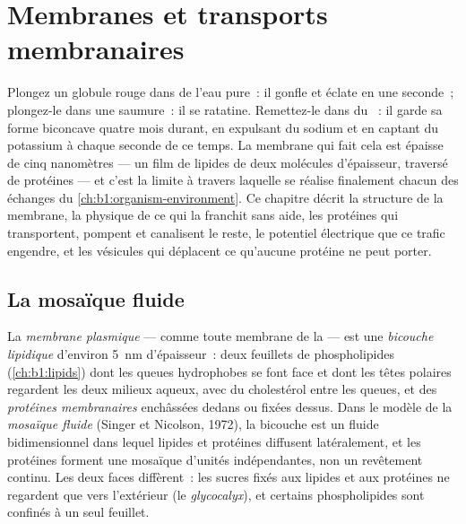 \chapter{Membranes et transports membranaires}\label{ch:b1:membranes-transport}

Plongez un globule rouge dans de l'eau pure~: il gonfle et éclate en une
seconde~; plongez-le dans une saumure~: il se ratatine. Remettez-le dans
du ~: il garde sa forme biconcave quatre mois durant, en expulsant
du sodium et en captant du potassium à chaque seconde de ce temps. La
membrane qui fait cela est épaisse de cinq nanomètres --- un film de
lipides de deux molécules d'épaisseur, traversé de protéines --- et
c'est la limite à travers laquelle se réalise finalement chacun des
échanges du \cref{ch:b1:organism-environment}. Ce chapitre décrit la
structure de la membrane, la physique de ce qui la franchit sans aide,
les protéines qui transportent, pompent et canalisent le reste, le
potentiel électrique que ce trafic engendre, et les vésicules qui
déplacent ce qu'aucune protéine ne peut porter.

\section{La mosaïque fluide}

\begin{definition}\label{def:b1:membranes-transport:membrane}
La \emph{membrane plasmique} --- comme toute
membrane de la  --- est une \emph{bicouche
lipidique} d'environ \qty{5}{nm} d'épaisseur~:
deux feuillets de phospholipides (\cref{ch:b1:lipids}) dont les queues
hydrophobes se font face et dont les têtes polaires regardent les deux
milieux aqueux, avec du cholestérol entre les queues, et des
\emph{protéines membranaires} enchâssées
dedans ou fixées dessus. Dans le modèle de la \emph{mosaïque
fluide} (Singer et Nicolson, 1972),
la bicouche est un fluide bidimensionnel dans lequel lipides et
protéines diffusent latéralement, et les protéines forment une mosaïque
d'unités indépendantes, non un revêtement continu. Les deux faces
diffèrent~: les sucres fixés aux lipides et aux protéines ne regardent
que vers l'extérieur (le \emph{glycocalyx}), et certains phospholipides
sont confinés à un seul feuillet.
\end{definition}

